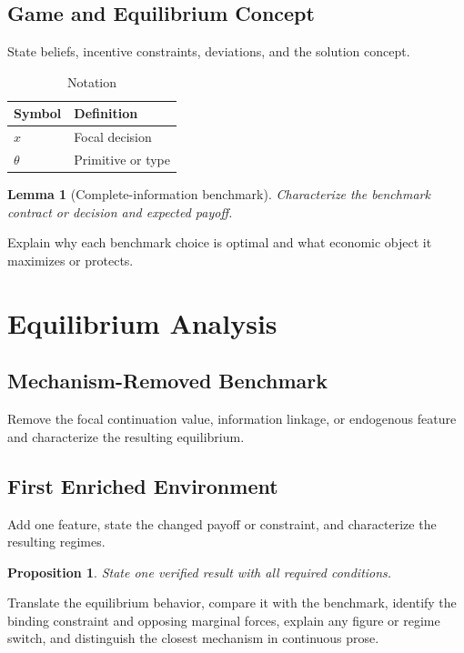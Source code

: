 \documentclass[11pt]{article}
\newtheorem{lemma}{Lemma}
\newtheorem{proposition}{Proposition}
\begin{document}
\subsection{Game and Equilibrium Concept}
State beliefs, incentive constraints, deviations, and the solution concept.

\begin{table}[t]
\centering
\caption{Notation}
\begin{tabular}{ll}
\toprule
Symbol & Definition \\
\midrule
$x$ & Focal decision \\
$\theta$ & Primitive or type \\
\bottomrule
\end{tabular}
\end{table}

\begin{lemma}[Complete-information benchmark]\label{lem:benchmark}
Characterize the benchmark contract or decision and expected payoff.
\end{lemma}

Explain why each benchmark choice is optimal and what economic object it maximizes or protects.

\section{Equilibrium Analysis}

\subsection{Mechanism-Removed Benchmark}
Remove the focal continuation value, information linkage, or endogenous feature and characterize the resulting equilibrium.

\subsection{First Enriched Environment}
Add one feature, state the changed payoff or constraint, and characterize the resulting regimes.

\begin{proposition}\label{prop:main}
State one verified result with all required conditions.
\end{proposition}

Translate the equilibrium behavior, compare it with the benchmark, identify the binding constraint and opposing marginal forces, explain any figure or regime switch, and distinguish the closest mechanism in continuous prose.
\end{document}
